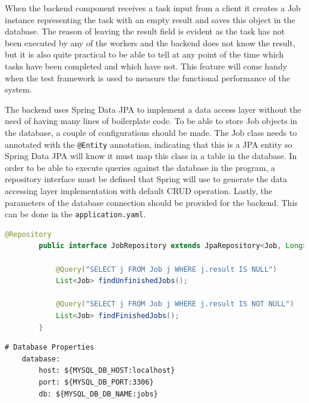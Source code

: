 When the backend component receives a task input from a client it creates a Job instance representing the task with an empty result and saves this object in the database. The reason of leaving the result field is evident as the task has not been executed by any of the workers and the backend does not know the result, but it is also quite practical to be able to tell at any point of the time which tasks have been completed and which have not. This feature will come handy when the test framework is used to measure the functional performance of the system.

The backend uses Spring Data JPA \cite{SpringDataJPA} to implement a data access layer without the need of having many lines of boilerplate code. To be able to store Job objects in the database, a couple of configurations should be made. The Job class needs to annotated with the \texttt{@Entity} annotation, indicating that this is a JPA entity so Spring Data JPA will know it must map this class in a table in the database. In order to be able to execute queries against the database in the program, a repository interface must be defined that Spring will use to generate the data accessing layer implementation with default CRUD operation. Lastly, the parameters of the database connection should be provided for the backend. This can be done in the \texttt{application.yaml}.

\begin{minipage}{\linewidth}
	\begin{lstlisting}[language=java, caption={\texttt{JobRepository} interface}, label={lst:JobRepository}]
		@Repository
		public interface JobRepository extends JpaRepository<Job, Long> {
			
			@Query("SELECT j FROM Job j WHERE j.result IS NULL")
			List<Job> findUnfinishedJobs();
			
			@Query("SELECT j FROM Job j WHERE j.result IS NOT NULL")
			List<Job> findFinishedJobs();
		}
	\end{lstlisting}
\end{minipage}

\begin{minipage}{\linewidth}
	\begin{lstlisting}[caption={Configuring the database connection}, label={lst:application-yaml-db}]
	# Database Properties
	database:
		host: ${MYSQL_DB_HOST:localhost}
		port: ${MYSQL_DB_PORT:3306}
		db: ${MYSQL_DB_DB_NAME:jobs}
	\end{lstlisting}
\end{minipage}

